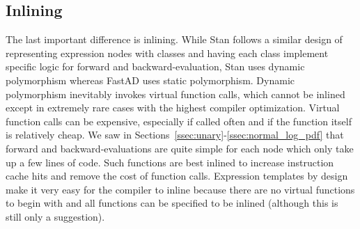 \subsection{Inlining}

The last important difference is inlining.
While Stan follows a similar design of representing
expression nodes with classes and having each class implement
specific logic for forward and backward-evaluation,
Stan uses dynamic polymorphism whereas FastAD uses static polymorphism.
Dynamic polymorphism inevitably invokes virtual function calls,
which cannot be inlined except in extremely rare cases
with the highest compiler optimization.
Virtual function calls can be expensive, especially if called often and
if the function itself is relatively cheap.
We saw in Sections~\ref{ssec:unary}-\ref{ssec:normal_log_pdf}
that forward and backward-evaluations are quite simple for each node
which only take up a few lines of code.
Such functions are best inlined to increase instruction cache hits
and remove the cost of function calls.
Expression templates by design make it very easy for the compiler to inline
because there are no virtual functions to begin with
and all functions can be specified to be inlined (although this is still only a suggestion).

